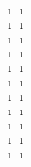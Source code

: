 \begin{tabular}{rr}
                  1 &             1 \\
                  1 &             1 \\
                  1 &             1 \\
                  1 &             1 \\
                  1 &             1 \\
                  1 &             1 \\
                  1 &             1 \\
                  1 &             1 \\
                  1 &             1 \\
                  1 &             1 \\
                  1 &             1 \\
\bottomrule
\end{tabular}
